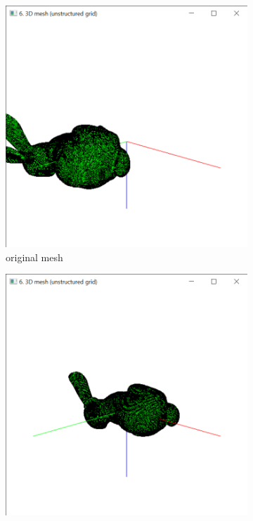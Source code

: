 \documentclass{bigdata}
\begin{document}
\begin{figure}[t!]
	\centering
	\begin{subfigure}[b]{0.4\linewidth}
		\includegraphics[width=\linewidth]{Pictures/Part2/Step0.png}
		\caption{original mesh}
	\end{subfigure}
	\begin{subfigure}[b]{0.4\linewidth}
		\includegraphics[width=\linewidth]{Pictures/Part2/step1.png}

\end{subfigure}
\end{figure}
\end{document}
